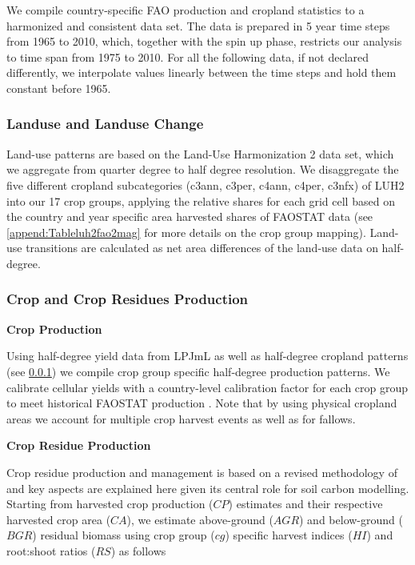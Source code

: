 \documentclass[gc, manuscript]{copernicus}
\begin{document}
We compile country-specific FAO production and cropland statistics \citep{faostat_faostat_2016} to a harmonized and consistent data set. The data is prepared in 5 year time steps from 1965 to 2010, which, together with the spin up phase, restricts our analysis to time span from 1975 to 2010. For all the following data, if not declared differently, we interpolate values linearly between the time steps and hold them constant before 1965.

\hypertarget{sec:landuse}{%
\subsubsection{Landuse and Landuse Change}\label{sec:landuse}}

Land-use patterns are based on the Land-Use Harmonization 2 \citep{Hurtt2020} data set, which we aggregate from quarter degree to half degree resolution. We disaggregate the five different cropland subcategories (c3ann, c3per, c4ann, c4per, c3nfx) of LUH2 into our 17 crop groups, applying the relative shares for each grid cell based on the country and year specific area harvested shares of FAOSTAT data \citep{faostat_faostat_2016} (see \ref{append:Tableluh2fao2mag} for more details on the crop group mapping). Land-use transitions are calculated as net area differences of the land-use data on half-degree.

\hypertarget{sec:residues}{%
\subsubsection{Crop and Crop Residues Production}\label{sec:residues}}

\textbf{Crop Production}

Using half-degree yield data from LPJmL \citep{schaphoff_lpjml4_2018} as well as half-degree cropland patterns (see \ref{sec:landuse}) we compile crop group specific half-degree production patterns. We calibrate cellular yields with a country-level calibration factor for each crop group to meet historical FAOSTAT production \citep{faostat_faostat_2016}. Note that by using physical cropland areas we account for multiple crop harvest events as well as for fallows.

\textbf{Crop Residue Production}

Crop residue production and management is based on a revised methodology of \citep{bodirsky_n2o_2012} and key aspects are explained here given its central role for soil carbon modelling. Starting from harvested crop production (\(CP\)) estimates and their respective harvested crop area (\(CA\)), we estimate above-ground (\(AGR\)) and below-ground (\(BGR\)) residual biomass using crop group (\(cg\)) specific harvest indices (\(HI\)) and root:shoot ratios (\(RS\)) as follows
\end{document}
